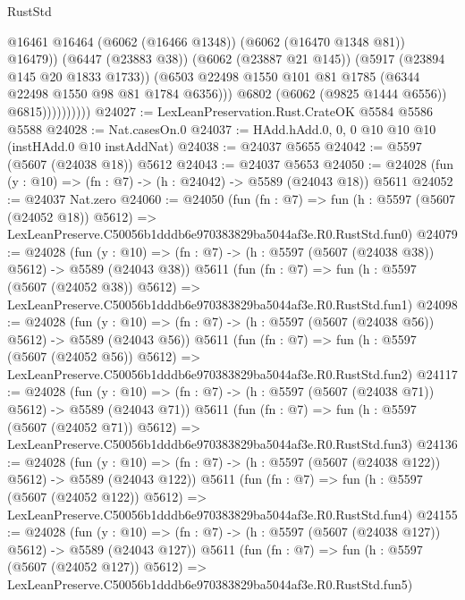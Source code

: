 \begin{lexlean}{RustStd}
\begin{coremodule}
                              @16461
                              @16464
                              (@6062 (@16466 @1348))
                              (@6062 (@16470 @1348 @81))
                              @16479))
                          (@6447 (@23883 @38))
                          (@6062 (@23887 @21 @145))
                          (@5917 (@23894 @145 @20 @1833 @1733))
                          (@6503
                            @22498
                            @1550
                            @101
                            @81
                            @1785
                            (@6344 @22498 @1550 @98 @81 @1784 @6356)))
                        @6802
                        (@6062 (@9825 @1444 @6556))
                        @6815))))))))))
@24027 := LexLeanPreservation.Rust.CrateOK @5584 @5586 @5588
@24028 := Nat.casesOn.{0}
@24037 := HAdd.hAdd.{0, 0, 0} @10 @10 @10 (instHAdd.{0} @10 instAddNat)
@24038 := @24037 @5655
@24042 := @5597 (@5607 (@24038 @18)) @5612
@24043 := @24037 @5653
@24050 := @24028 (fun (y : @10) => (fn : @7) -> (h : @24042) -> @5589 (@24043 @18)) @5611
@24052 := @24037 Nat.zero
@24060 := @24050
    (fun (fn : @7) =>
    fun (h : @5597 (@5607 (@24052 @18)) @5612) =>
    LexLeanPreserve.C50056b1dddb6e970383829ba5044af3e.R0.RustStd.fun0)
@24079 := @24028
    (fun (y : @10) => (fn : @7) -> (h : @5597 (@5607 (@24038 @38)) @5612) -> @5589 (@24043 @38))
    @5611
    (fun (fn : @7) =>
    fun (h : @5597 (@5607 (@24052 @38)) @5612) =>
    LexLeanPreserve.C50056b1dddb6e970383829ba5044af3e.R0.RustStd.fun1)
@24098 := @24028
    (fun (y : @10) => (fn : @7) -> (h : @5597 (@5607 (@24038 @56)) @5612) -> @5589 (@24043 @56))
    @5611
    (fun (fn : @7) =>
    fun (h : @5597 (@5607 (@24052 @56)) @5612) =>
    LexLeanPreserve.C50056b1dddb6e970383829ba5044af3e.R0.RustStd.fun2)
@24117 := @24028
    (fun (y : @10) => (fn : @7) -> (h : @5597 (@5607 (@24038 @71)) @5612) -> @5589 (@24043 @71))
    @5611
    (fun (fn : @7) =>
    fun (h : @5597 (@5607 (@24052 @71)) @5612) =>
    LexLeanPreserve.C50056b1dddb6e970383829ba5044af3e.R0.RustStd.fun3)
@24136 := @24028
    (fun (y : @10) => (fn : @7) -> (h : @5597 (@5607 (@24038 @122)) @5612) -> @5589 (@24043 @122))
    @5611
    (fun (fn : @7) =>
    fun (h : @5597 (@5607 (@24052 @122)) @5612) =>
    LexLeanPreserve.C50056b1dddb6e970383829ba5044af3e.R0.RustStd.fun4)
@24155 := @24028
    (fun (y : @10) => (fn : @7) -> (h : @5597 (@5607 (@24038 @127)) @5612) -> @5589 (@24043 @127))
    @5611
    (fun (fn : @7) =>
    fun (h : @5597 (@5607 (@24052 @127)) @5612) =>
    LexLeanPreserve.C50056b1dddb6e970383829ba5044af3e.R0.RustStd.fun5)

\end{coremodule}
\end{lexlean}
